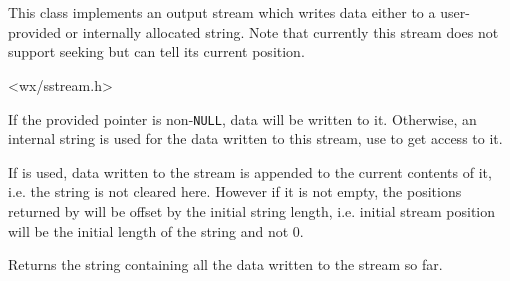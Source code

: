 
\section{}\label{wxstringoutputstream}

This class implements an output stream which writes data either to a
user-provided or internally allocated string. Note that currently this stream
does not support seeking but can tell its current position.




<wx/sstream.h>





\label{wxstringoutputstreamctor}


If the provided pointer is non-\texttt{NULL}, data will be written to it.
Otherwise, an internal string is used for the data written to this stream, use 
 to get access to it.

If  is used, data written to the stream is appended to the current
contents of it, i.e. the string is not cleared here. However if it is not
empty, the positions returned by  will be
offset by the initial string length, i.e. initial stream position will be the
initial length of the string and not $0$.


\label{wxstringoutputstreamgetstring}


Returns the string containing all the data written to the stream so far.

